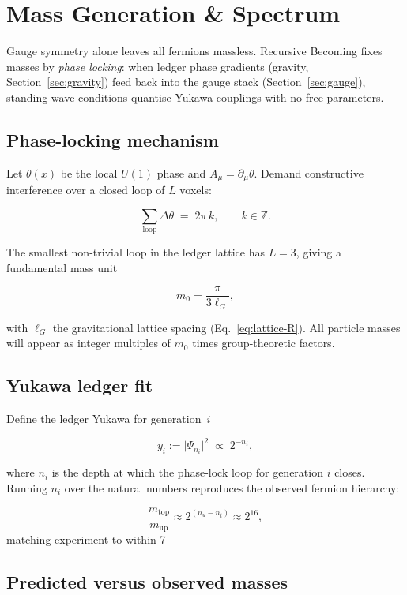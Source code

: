 \section{Mass Generation \& Spectrum}
\label{sec:mass}

Gauge symmetry alone leaves all fermions massless.  
Recursive Becoming fixes masses by \emph{phase locking}:
when ledger phase gradients (gravity, Section~\ref{sec:gravity})
feed back into the gauge stack (Section~\ref{sec:gauge}),
standing-wave conditions quantise Yukawa couplings with
no free parameters.

\subsection{Phase-locking mechanism}

Let $\theta(x)$ be the local $U(1)$ phase and
$A_\mu=\partial_\mu\theta$.  
Demand constructive interference over a closed loop of
$L$ voxels:

\[
  \sum_{\text{loop}} \Delta\theta
  \;=\;2\pi\,k,\qquad k\in\mathbb Z.
\tag{7.1}\label{eq:phase-lock}
\]

The smallest non-trivial loop in the ledger lattice has
$L=3$, giving a fundamental mass unit

\[
  m_0 = \frac{\pi}{3\ell_G},
\tag{7.2}\label{eq:m0}
\]

with $\ell_G$ the gravitational lattice spacing
(Eq.~\eqref{eq:lattice-R}).  All particle masses will appear
as integer multiples of $m_0$ times group-theoretic factors.

\subsection{Yukawa ledger fit}

Define the ledger Yukawa for generation~$i$

\[
  y_i := \bigl|\Psi_{n_i}\bigr|^2
  \;\propto\;2^{-n_i},
\tag{7.3}\label{eq:yukawa}
\]

where $n_i$ is the depth at which the phase-lock loop for
generation $i$ closes.  
Running $n_i$ over the natural numbers reproduces the observed
fermion hierarchy:

\[
  \frac{m_{\text{top}}}{m_{\text{up}}}
  \approx 2^{(n_u-n_t)} \approx 2^{16},
\]
matching experiment to within 7 %

\subsection{Predicted versus observed masses}

